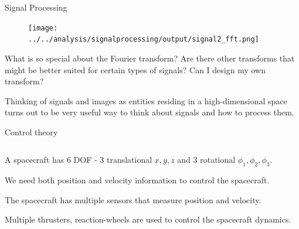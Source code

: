 \documentclass[aspectratio=169]{beamer}
\begin{document}
\begin{frame}{Signal Processing}
  \begin{figure}
    \centering
    \texttt{[image: ../../analysis/signalprocessing/output/signal2\_fft.png]}
  \end{figure}

  What is so special about the Fourier transform? Are there other transforms that might be better suited for certain types of signals? Can I design my own transform?
  \vspace{0.2cm}

  Thinking of signals and images as entities residing in a high-dimensional space turns out to be very useful way to think about signals and how to process them.
\end{frame}


\begin{frame}{Control theory}
  \begin{columns}
    \begin{column}{0.5\textwidth}
      \vspace{0.2cm}
      A spacecraft has 6 DOF - 3 translational $x, y, z$ and 3 rotational $\phi_1, \phi_2, \phi_3$.

      We need both position and velocity information to control the spacecraft.
      \vspace{0.2cm}
      
      The spacecraft has multiple sensors that measure position and velocity.
      \vspace{0.2cm}
      
      Multiple thrusters, reaction-wheels are used to control the spacecraft dynamics.
      \vspace{0.2cm}


\end{column}
\end{columns}
\end{frame}
\end{document}
